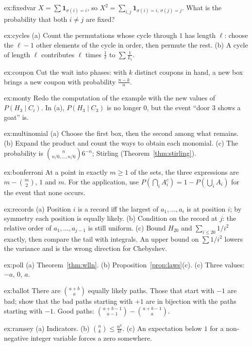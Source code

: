 \begin{hint}{ex:fixedvar}
$X=\sum\mathbf 1_{\sigma(i)=i}$, so $X^2=\sum_{i,j}\mathbf 1_{\sigma(i)=i,\,\sigma(j)=j}$. What is the probability that both $i\ne j$ are fixed?
\end{hint}
\begin{hint}{ex:cycles}
(a) Count the permutations whose cycle through $1$ has length $\ell$: choose the $\ell-1$ other elements of the cycle in order, then permute the rest. (b) A cycle of length $\ell$ contributes $\ell$ times $\frac1\ell$ to $\sum\frac1{L_i}$.
\end{hint}
\begin{hint}{ex:coupon}
Cut the wait into phases: with $k$ distinct coupons in hand, a new box brings a new coupon with probability $\frac{n-k}n$.
\end{hint}

\begin{hint}{ex:monty}
Redo the computation of the example with the new values of $P(H_3\mid C_i)$. In (a), $P(H_3\mid C_3)$ is no longer $0$, but the event ``door $3$ shows a goat'' is.
\end{hint}
\begin{hint}{ex:multinomial}
(a) Choose the first box, then the second among what remains. (b) Expand the product and count the ways to obtain each monomial. (c) The probability is $\binom n{n/6,\dots,n/6}6^{-n}$; Stirling (Theorem~\ref{thm:stirling}).
\end{hint}

\begin{hint}{ex:bonferroni}
At a point in exactly $m\ge1$ of the sets, the three expressions are $m-\binom m2$, $1$ and $m$. For the application, use $P(\bigcap_i A_i^c)=1-P(\bigcup_i A_i)$ for the event that none occurs.
\end{hint}
\begin{hint}{ex:records}
(a) Position $i$ is a record iff the largest of $a_1,\dots,a_i$ is at position $i$; by symmetry each position is equally likely. (b) Condition on the record at $j$: the relative order of $a_1,\dots,a_{j-1}$ is still uniform. (c) Bound $H_{20}$ and $\sum_{i\le20}1/i^2$ exactly, then compare the tail with integrals. An upper bound on $\sum 1/i^2$ lowers the variance and is the wrong direction for Chebyshev.
\end{hint}
\begin{hint}{ex:poll}
(a) Theorem~\ref{thm:wlln}. (b) Proposition~\ref{prop:laws}(c). (c) Three values: $-a$, $0$, $a$.
\end{hint}
\begin{hint}{ex:ballot}
There are $\binom{a+b}a$ equally likely paths. Those that start with $-1$ are bad; show that the bad paths starting with $+1$ are in bijection with the paths starting with $-1$. Good paths: $\binom{a+b-1}{a-1}-\binom{a+b-1}{a}$.
\end{hint}
\begin{hint}{ex:ramsey}
(a) Indicators. (b) $\binom nk\le\frac{n^k}{k!}$. (c) An expectation below $1$ for a non-negative integer variable forces a zero somewhere.
\end{hint}

